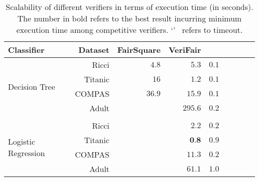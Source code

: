 \begin{table}[!t]
	\caption[Scalability of {\justicia}]{Scalability of different verifiers in terms of execution time (in seconds). The number in bold refers to the best result incurring minimum execution time among competitive verifiers. `\textemdash'~ refers to timeout.}
	\label{fairness_justicia_tab:FS_VF_Justicia}
	\centering
	\begin{tabular}{lrrrrrrrr}
		\toprule
		Classifier & Dataset & FairSquare & VeriFair & {\justicia} \\
		\midrule
		\multirow{4}{*}{Decision Tree} & Ricci & $ 4.8 $ & $ 5.3 $ & $ \mathbf{0.1} $ \\
		& Titanic & $ 16 $ & $ 1.2 $ & $ \mathbf{0.1} $ \\
		& COMPAS & $ 36.9 $ & $ 15.9 $ & $ \mathbf{0.1} $ \\
		& Adult & \textemdash & $ 295.6 $ & $ \mathbf{0.2} $ \\
		\\
		\multirow{4}{*}{Logistic Regression} & Ricci & \textemdash & $ 2.2 $ & $ \mathbf{0.2} $ \\
		& Titanic & \textemdash & $ \textbf{0.8} $ & $ 0.9 $ \\
		& COMPAS & \textemdash & $ 11.3 $ & $ \mathbf{0.2} $ \\
		& Adult & \textemdash & $ 61.1 $ & $ \mathbf{1.0} $ \\
		
		\bottomrule
		
	\end{tabular}
\end{table}
